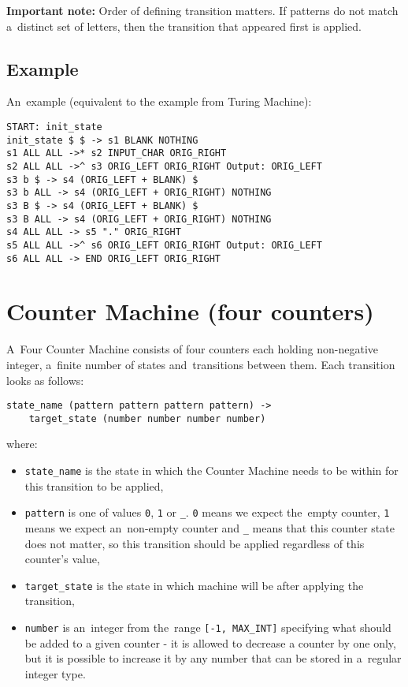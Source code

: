 \documentclass[english,shortabstract,mgr]{iithesis}
\begin{document}
\textbf{Important note:} Order of defining transition matters. If patterns do not match
a~distinct set of letters, then the transition that appeared first is applied.

\subsection{Example}

An~example (equivalent to the example from Turing Machine):
\begin{verbatim}
START: init_state
init_state $ $ -> s1 BLANK NOTHING
s1 ALL ALL ->* s2 INPUT_CHAR ORIG_RIGHT
s2 ALL ALL ->^ s3 ORIG_LEFT ORIG_RIGHT Output: ORIG_LEFT
s3 b $ -> s4 (ORIG_LEFT + BLANK) $
s3 b ALL -> s4 (ORIG_LEFT + ORIG_RIGHT) NOTHING
s3 B $ -> s4 (ORIG_LEFT + BLANK) $
s3 B ALL -> s4 (ORIG_LEFT + ORIG_RIGHT) NOTHING
s4 ALL ALL -> s5 "." ORIG_RIGHT
s5 ALL ALL ->^ s6 ORIG_LEFT ORIG_RIGHT Output: ORIG_LEFT
s6 ALL ALL -> END ORIG_LEFT ORIG_RIGHT
\end{verbatim}

\section {Counter Machine (four counters)}

A~Four Counter Machine consists of four counters each holding non-negative integer,
a~finite number of states and~transitions between them. Each transition
looks as follows:

\begin{verbatim}
state_name (pattern pattern pattern pattern) ->
    target_state (number number number number)
\end{verbatim}

where:
\begin{itemize}
  \item \texttt{state\_name} is the state in which the Counter Machine needs to be
      within for this transition to be applied,
  \item \texttt{pattern} is one of values \texttt{0}, \texttt{1} or \texttt{\_}.
      \texttt{0} means we expect the~empty counter, \texttt{1} means we expect an~non-empty
      counter and \texttt{\_} means that this counter state does not matter, so
      this transition should be applied regardless of this counter's value,
  \item \texttt{target\_state} is the state in which machine will be after
      applying the transition,
  \item \texttt{number} is an~integer from the~range \texttt{[-1, MAX\_INT]} specifying
      what should be added to a given counter - it is allowed to decrease a counter
      by one only, but it is possible to increase it by any number that can be stored
      in a~regular integer type.
\end{itemize}
\end{document}
